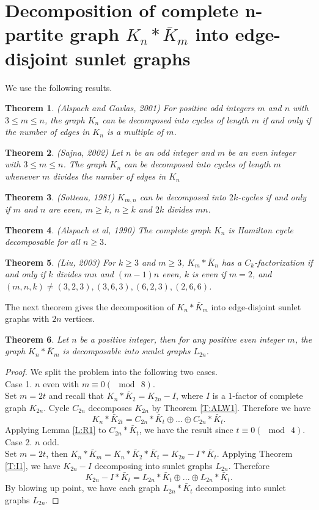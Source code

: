 \documentclass[12pt]{report}
\newtheorem{thm}{Theorem}[section]
\begin{document}
\section{Decomposition of complete n-partite graph $K_n*\bar{K}_m$ into edge-disjoint sunlet graphs }
We use the following results.
\begin{thm}\label{T:AGA1}(Alspach and Gavlas, 2001) %
For positive odd integers $m$ and $n$ with $3\leq m\leq n$, the
graph $K_n$ can be decomposed into cycles of length $m$ if and only
if the number of edges in $K_n$ is a multiple of $m$.
\end{thm}
\begin{thm}\label{T:SNA4}(Sajna, 2002) %
 Let $n$ be an odd integer and $m$ be an even integer with $3\leq
m\leq n$. The graph $K_n$ can be decomposed into cycles of length
$m$ whenever $m$ divides the number of edges in $K_n$
\end{thm}
\begin{thm}\label{T:SOT}(Sotteau, 1981) %
$K_{m,n}$ can be decomposed into $2k$-cycles if and only if $m$ and
$n$ are even, $m\geq k$, $n\geq k$ and $2k$ divides $mn$.
\end{thm}
\begin{thm}\label{T:AET}(Alspach  et al, 1990) %
The complete graph $K_n$ is Hamilton cycle decomposable for all
$n\geq 3$.
\end{thm}
\begin{thm}\label{T:IU}(Liu, 2003) %
For $k\geq 3$ and $m\geq 3$, $K_m*\bar{K}_n$ has a
$C_k$-factorization if and only if $k$ divides $mn$ and $(m-1)n$
even, $k$ is even if $m=2$, and $(m,n,k)\neq
(3,2,3),(3,6,3),(6,2,3),(2,6,6)$.
\end{thm}
The next theorem gives the decomposition of $K_n*\bar{K}_m$ into edge-disjoint sunlet graphs with $2n$ vertices.
\begin{thm}
Let $n$ be a positive integer, then for any positive even integer
$m$, the graph $K_n*\bar{K}_m$ is decomposable into sunlet graphs
$L_{2n}$.
\end{thm}
\begin{proof}
We split the problem into the following two cases.\\
Case 1. $n$ even with $m\equiv 0(\mod\ 8)$.\\
Set $m=2t$ and recall that $K_n*\bar{K}_2=K_{2n}-I$, where $I$ is a
$1$-factor of complete graph $K_{2n}$. Cycle $C_{2n}$ decomposes
$K_{2n}$ by Theorem \ref{T:ALW1}. Therefore we have
$$K_n*\bar{K}_{2t}=C_{2n}*\bar{K}_t\oplus...\oplus C_{2n}*\bar{K}_t.$$
Applying Lemma \ref{L:R1} to $C_{2n}*\bar{K}_t$, we have the result
since $t\equiv 0(\mod\
4)$.\\

Case 2. $n$ odd.\\
Set $m=2t$, then
$K_n*\bar{K}_m=K_n*\bar{K}_2*\bar{K}_t=K_{2n}-I*\bar{K}_t$. Applying
Theorem \ref{T:I1}, we have $K_{2n}-I$ decomposing into sunlet
graphs $L_{2n}$. Therefore $$K_{2n}-I*\bar{K}_t=
L_{2n}*\bar{K}_t\oplus...\oplus L_{2n}*\bar{K}_t.$$ By blowing up
point, we have each graph $L_{2n}*\bar{K}_t$ decomposing into sunlet
graphs $L_{2n}$.
\end{proof}
\end{document}
